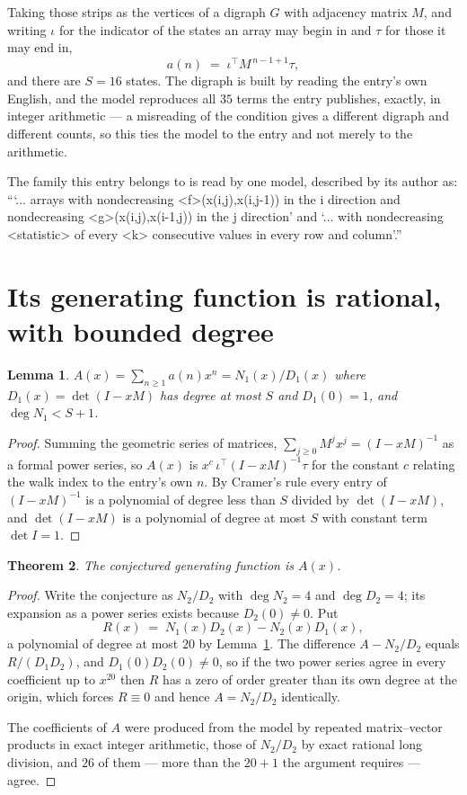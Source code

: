 \documentclass[11pt,a4paper]{article}
\theoremstyle{plain}
\newtheorem{theorem}{Theorem}
\newtheorem{lemma}[theorem]{Lemma}
\theoremstyle{definition}
\begin{document}
Taking those strips as the vertices of a digraph $G$ with adjacency matrix $M$, and writing
$\iota$ for the indicator of the states an array may begin in and $\tau$ for those it may end
in,
\[
a(n)\;=\;\iota^{\!\top}M^{\,n-1+1}\tau ,
\]
and there are $S=16$ states. The digraph is built by reading the entry's own English, and the
model reproduces all $35$ terms the entry publishes, exactly, in integer arithmetic --- a
misreading of the condition gives a different digraph and different counts, so this ties the
model to the entry and not merely to the arithmetic.

The family this entry belongs to is read by one model, described by its author as: ```... arrays with nondecreasing <f>(x(i,j),x(i,j-1)) in the i direction and nondecreasing <g>(x(i,j),x(i-1,j)) in the j direction' and `... with nondecreasing <statistic> of every <k> consecutive values in every row and column'.''


\section{Its generating function is rational, with bounded degree}

\begin{lemma}\label{lem:rat}
$A(x)=\sum_{n\ge1}a(n)x^n=N_1(x)/D_1(x)$ where $D_1(x)=\det(I-xM)$ has degree at most
$S$ and $D_1(0)=1$, and $\deg N_1<S+1$.
\end{lemma}

\begin{proof}
Summing the geometric series of matrices, $\sum_{j\ge0}M^jx^j=(I-xM)^{-1}$ as a formal
power series, so $A(x)$ is $x^{c}\,\iota^{\!\top}(I-xM)^{-1}\tau$ for the constant $c$
relating the walk index to the entry's own $n$. By Cramer's rule every entry of
$(I-xM)^{-1}$ is a polynomial of degree less than $S$ divided by $\det(I-xM)$, and
$\det(I-xM)$ is a polynomial of degree at most $S$ with constant term $\det I=1$.
\end{proof}

\begin{theorem}
The conjectured generating function is $A(x)$.
\end{theorem}

\begin{proof}
Write the conjecture as $N_2/D_2$ with $\deg N_2=4$ and $\deg D_2=4$; its expansion as a
power series exists because $D_2(0)\neq0$. Put
\[
R(x)\;=\;N_1(x)D_2(x)-N_2(x)D_1(x),
\]
a polynomial of degree at most $20$ by Lemma~\ref{lem:rat}. The difference
$A-N_2/D_2$ equals $R/(D_1D_2)$, and $D_1(0)D_2(0)\neq0$, so if the two power series agree in
every coefficient up to $x^{20}$ then $R$ has a zero of order greater than its own
degree at the origin, which forces $R\equiv0$ and hence $A=N_2/D_2$ identically.

The coefficients of $A$ were produced from the model by repeated matrix--vector products in
exact integer arithmetic, those of $N_2/D_2$ by exact rational long division, and $26$
of them --- more than the $20+1$ the argument requires --- agree.
\end{proof}
\end{document}
